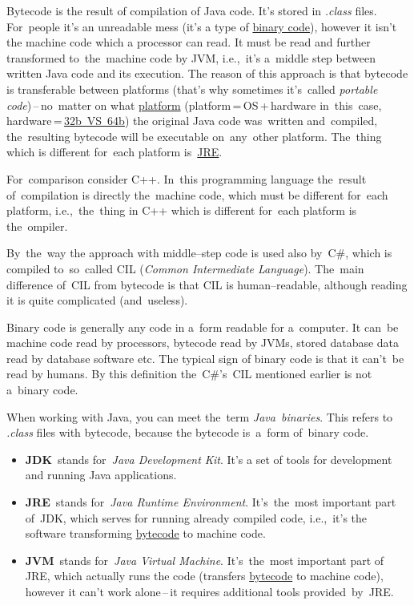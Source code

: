 
\label{bytecode}
Bytecode is the result of compilation of Java code.
It's stored in \textit{.class} files.
For~people it's an unreadable mess (it's a type of \hyperref[bytecodebinarycode]{binary code}), however it isn't the machine code which a processor can read.
It must be read and further transformed to~the~machine code by JVM, i.e.,~it's a~middle step between written Java code and its execution.
The reason of this approach is that bytecode is transferable between platforms (that's why sometimes it's~called \textit{portable code})\,--\,no~matter on what \hyperref[platform]{platform} (platform\,=\,OS\,+\,hardware in~this~case, hardware\,=\,\hyperref[32bvs64b]{32b~VS~64b}) the original Java code was~written and~compiled, the~resulting bytecode will be executable on~any~other platform.
The~thing which is different for~each platform is~\hyperref[jdkjrejvm]{JRE}.

For~comparison consider C++.
In~this programming language the~result of~compilation is directly the~machine code, which must be different for~each platform, i.e.,~the~thing in C++ which is different for~each platform is the~ompiler.

By~the~way the approach with middle--step code is used also by~C\#, which is compiled to~so~called CIL (\textit{Common Intermediate Language}).
The~main difference of~CIL from bytecode is that CIL is human--readable, although reading it is quite complicated (and~useless).

\label{bytecodebinarycode}
Binary code is generally any code in a~form readable for a~computer.
It can~be machine code read by processors, bytecode read by JVMs, stored database data read by database software etc.
The typical sign of binary code is that it can't~be read by humans.
By this definition the~C\#'s~CIL mentioned earlier is not a~binary code.

When working with Java, you can meet the~term \textit{Java~binaries}.
This refers to \textit{.class} files with bytecode, because the bytecode is~a~form of~binary code.
\newpage

\label{jdkjrejvm}
\begin{itemize}
    \item \textbf{JDK}~stands for~\textit{Java Development Kit}.
          It's a set of tools for development and running Java applications.
    \item \textbf{JRE}~stands for~\textit{Java Runtime Environment}.
          It's~the~most important part of~JDK, which serves for running already compiled code, i.e.,~it's the software transforming \hyperref[bytecode]{bytecode} to machine code.
    \item \textbf{JVM}~stands for~\textit{Java Virtual Machine}.
          It's~the~most important part of JRE, which actually runs the code (transfers \hyperref[bytecode]{bytecode} to machine code), however it can't work alone\,--\,it requires additional tools provided~by~JRE.
\end{itemize}

